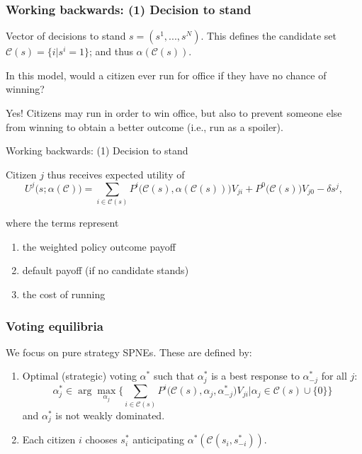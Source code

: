\documentclass[11pt,aspectratio=169]{beamer}
\begin{document}
\begin{frame}
\frametitle{Working backwards: (1) Decision to stand}

Vector of decisions to stand $s=(s^1,...,s^N)$. This defines the candidate set $\mathcal{C}(s) = \{i|s^i=1\}$; and thus $\alpha(\mathcal{C}(s))$. 

\bigskip

\pause 
\begin{tcolorbox}
In this model, would a citizen ever run for office if they have no chance of winning?
\end{tcolorbox}

\pause

Yes! Citizens may run in order to win office, but also to prevent someone else from winning to obtain a better outcome (i.e., run as a spoiler).


\end{frame}

\begin{frame}{Working backwards: (1) Decision to stand}

Citizen $j$ thus receives expected utility of $$U^j\bigg(s; \alpha(\mathcal{C})\bigg) = \sum_{i\in\mathcal{C}(s)} P^i\bigg(\mathcal{C}(s), \alpha(\mathcal{C}(s))\bigg)V_{ji} + P^0\bigg(\mathcal{C}(s)\bigg)V_{j0} - \delta s^j,$$

\bigskip

where the terms represent

\begin{enumerate}
\item the weighted policy outcome payoff \\
\item default payoff (if no candidate stands) \\
\item the cost of running
\end{enumerate}



\end{frame}



\begin{frame}
\frametitle{Voting equilibria}

We focus on pure strategy SPNEs. These are defined by: \begin{enumerate}
\item Optimal (strategic) voting $\alpha^*$ such that $\alpha_j^*$ is a best response to $\alpha_{-j}^*$ for all $j$: $$\alpha_j^* \in \arg \max_{\alpha_j} \bigg\{ \sum_{i\in \mathcal{C}(s)} P^i\bigg(\mathcal{C}(s), \alpha_j, \alpha_{-j}^*\bigg)V_{ji} \bigg| \alpha_j \in \mathcal{C}(s) \cup \{0\} \bigg\}$$ and $\alpha_j^*$ is not weakly dominated.%
\item Each citizen $i$ chooses $s_i^*$ anticipating $\alpha^*(\mathcal{C}(s_i,s^*_{-i}))$. 
\end{enumerate}

\end{frame}
\end{document}
